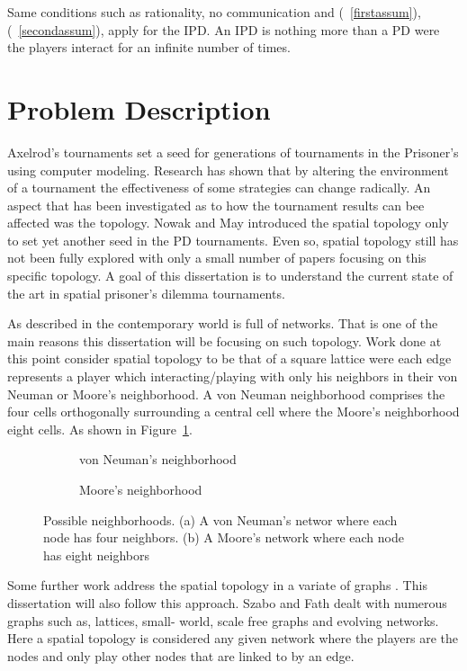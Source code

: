 Same conditions such as rationality, no communication and (~\ref{firstassum}),
(~\ref{secondassum}),
apply for the IPD. An IPD is nothing more than a PD were
the players interact for an infinite number of times.

\section{Problem Description}
Axelrod's tournaments set a seed for generations of tournaments in the
Prisoner's using computer modeling. Research has shown that by altering the
environment of a tournament the effectiveness of some strategies can change
radically. An aspect that has been investigated as to how the tournament results
can bee affected was the topology. Nowak and May \cite{Nowak1992} introduced the spatial topology
only to set yet another seed in the PD tournaments. Even so, spatial topology
still has not been fully explored with only a small number of papers focusing on
this specific topology.  A goal of this dissertation is to understand the
current state of the art in spatial prisoner’s dilemma tournaments.

As described in \cite{MacLane1971} the contemporary world is full of networks. That
is one of the main reasons this dissertation will be focusing on such topology.
Work done at this point consider spatial topology to be that of a square lattice
were each edge represents a player which interacting/playing with only his
neighbors in their von Neuman or Moore's neighborhood. A von Neuman neighborhood
comprises the four cells orthogonally surrounding a central cell where the
Moore's neighborhood eight cells. As shown in Figure~\ref{fig:neighborhood}.

\begin{figure}[!hbtp]
	\centering
	\begin{subfigure}[h]{0.45\textwidth}
		\centering
		
		\caption{von Neuman's neighborhood}
	\end{subfigure}
	\hfill
	\begin{subfigure}[h]{0.52\textwidth}\centering
		\centering
		
		\caption{Moore's neighborhood}
	\end{subfigure}
  \caption{Possible neighborhoods. (a) A von Neuman's networ where each node has four neighbors.
  (b) A Moore's network where each node has eight neighbors}
  \label{fig:neighborhood}
\end{figure}

Some further work address the spatial topology in a variate of graphs
\cite{Dresher1992a, Szabo2007, Lutz2013, Meng2015}.
This dissertation will also follow this approach. Szabo and Fath dealt with
numerous graphs such as, lattices, small- world, scale free graphs and evolving
networks. Here a spatial topology is considered any given network where the
players are the nodes and only play other nodes that are linked to by
an edge.

